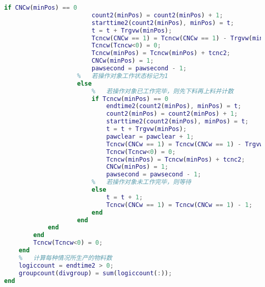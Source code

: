 \documentclass[no-math,withoutpreface,bwprint]{cumcmthesis} %
\numberwithin{equation}{section}
\numberwithin{figure}{section}
\numberwithin{table}{section}
\begin{document}
\begin{lstlisting}[language=matlab]
                    if CNCw(minPos) == 0
                        count2(minPos) = count2(minPos) + 1;
                        starttime2(count2(minPos), minPos) = t;
                        t = t + Trgvw(minPos);
                        Tcncw(CNCw == 1) = Tcncw(CNCw == 1) - Trgvw(minPos);
                        Tcncw(Tcncw<0) = 0;
                        Tcncw(minPos) = Tcncw(minPos) + tcnc2;
                        CNCw(minPos) = 1;
                        pawsecond = pawsecond - 1;
                    %   若操作对象工作状态标记为1
                    else
                        %   若操作对象已工作完毕，则先下料再上料并计数
                        if Tcncw(minPos) == 0
                            endtime2(count2(minPos), minPos) = t;
                            count2(minPos) = count2(minPos) + 1;
                            starttime2(count2(minPos), minPos) = t;
                            t = t + Trgvw(minPos);
                            pawclear = pawclear + 1;
                            Tcncw(CNCw == 1) = Tcncw(CNCw == 1) - Trgvw(minPos);
                            Tcncw(Tcncw<0) = 0;
                            Tcncw(minPos) = Tcncw(minPos) + tcnc2;
                            CNCw(minPos) = 1;
                            pawsecond = pawsecond - 1;
                        %   若操作对象未工作完毕，则等待
                        else
                            t = t + 1;
                            Tcncw(CNCw == 1) = Tcncw(CNCw == 1) - 1;
                        end
                    end
            end
        end
        Tcncw(Tcncw<0) = 0;
    end
    %   计算每种情况所生产的物料数
    logiccount = endtime2 > 0;
    groupcount(divgroup) = sum(logiccount(:));
end


\end{lstlisting}
\end{document}
